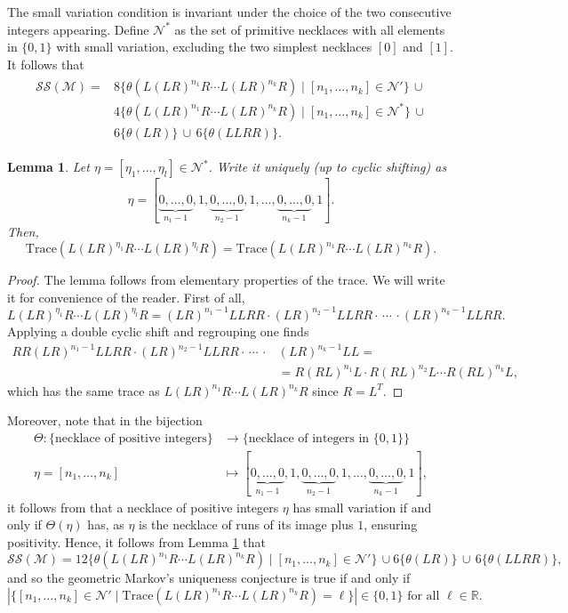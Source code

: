 \documentclass[12pt,reqno]{amsart}
\numberwithin{equation}{part}
\theoremstyle{plain}
\newtheorem{lemma}[theorem]{Lemma}
\theoremstyle{definition}
\newcommand{\Tr}{\mathrm{Trace}}
\begin{document}
The small variation condition is invariant under the choice of the two consecutive integers appearing. Define $\mathcal{N}^*$ as the set of primitive necklaces with all elements in $\{0,1\}$ with small variation, excluding the two simplest necklaces $[0]$ and $[1]$. It follows that 
\begin{align}\label{eq:spec}
\begin{split}
\mathcal{SS}(\mathcal{M})=&8\{\theta(L(LR)^{n_1}R\cdots L(LR)^{n_k}R)\mid [n_1,\hdots, n_k]\in\mathcal{N}'\}\,\cup\\ &4\{\theta(L(LR)^{n_1}R\cdots L(LR)^{n_k}R)\mid [n_1,\hdots, n_k]\in\mathcal{N}^*\}\,\cup\\ &6\{\theta(LR)\}\,\cup\, 6\{\theta(LLRR)\}.
\end{split}
\end{align}



\begin{lemma}\label{lem:eta} Let $\eta=[\eta_1,\hdots, \eta_l]\in \mathcal{N}^*$. Write it uniquely (up to cyclic shifting) as \[\eta=[\underbrace{0,\hdots,0}_{n_1-1},1,\underbrace{0,\hdots,0}_{n_2-1},1,\hdots,\underbrace{0,\hdots,0}_{n_k-1},1].\]
Then, 
\[
\Tr(L(LR)^{\eta_1}R\cdots L(LR)^{\eta_l}R)=\Tr(L(LR)^{n_1}R\cdots L(LR)^{n_k}R).
\]
\end{lemma}
\begin{proof}
    The lemma follows from elementary properties of the trace. We will write it for convenience of the reader. First of all, 
    \[
    L(LR)^{\eta_1}R\cdots L(LR)^{\eta_l}R=(LR)^{n_1-1}LLRR \cdot(LR)^{n_2-1}LLRR\cdot \,\cdots\,\cdot  (LR)^{n_k-1}LLRR.  
    \]
    Applying a double cyclic shift and regrouping one finds 
    \begin{align*}RR(LR)^{n_1-1}LLRR \cdot(LR)^{n_2-1}LLRR\cdot \,\cdots\,\cdot  &(LR)^{n_k-1}LL = \\  &=R(RL)^{n_1}L\cdot R(RL)^{n_2}L\cdots R(RL)^{n_k}L,\end{align*}
    which has the same trace as $L(LR)^{n_1}R\cdots L(LR)^{n_k}R$ since $R=L^T$.
\end{proof}
Moreover, note that in the bijection
\begin{align*}
    \Theta:\{\text{necklace of positive integers}\}&\longrightarrow \{\text{necklace of integers in }\{0,1\}\}\\
    \eta=[n_1,\hdots, n_k]&\longmapsto [\underbrace{0,\hdots,0}_{n_1-1},1,\underbrace{0,\hdots,0}_{n_2-1},1,\hdots,\underbrace{0,\hdots,0}_{n_k-1},1],
\end{align*}
it follows from \cite[Lemma~2.9]{FL24} that a necklace of positive integers $\eta$ has small variation if and only if $\Theta(\eta)$ has, as $\eta$ is the necklace of runs of its image plus $1$, ensuring positivity.
Hence, it follows from Lemma \ref{lem:eta} that
\[
\mathcal{SS}(\mathcal{M})=12\{\theta(L(LR)^{n_1}R\cdots L(LR)^{n_k}R)\mid [n_1,\hdots, n_k]\in\mathcal{N}'\}\,\cup 6\{\theta(LR)\}\,\cup\, 6\{\theta(LLRR)\},
\] 
and so the geometric Markov's uniqueness conjecture is true if and only if 
\[
|\{[n_1,\dots, n_k]\in\mathcal{N}' \mid \mathrm{Trace}(L(LR)^{n_1}R \cdots L(LR)^{n_k}R)=\ell \}|\in \{0,1\} \text{ for all }\ell\in\mathbb{R}.
\]
\end{document}
